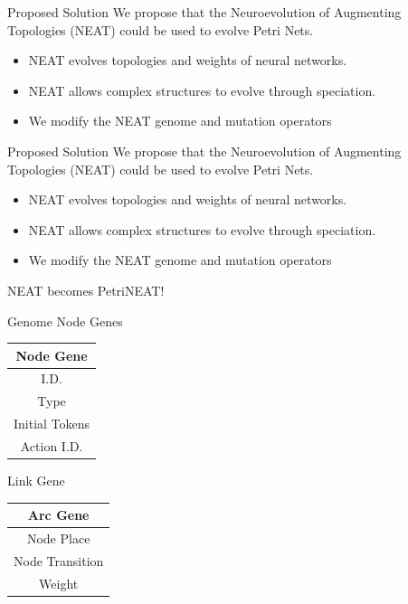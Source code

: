 \documentclass[12pt]{beamer}
\begin{document}
\begin{frame}{Proposed Solution}
We propose that the Neuroevolution of Augmenting Topologies (NEAT) could be used to evolve Petri Nets.
\begin{itemize}
\item NEAT evolves topologies and weights of neural networks.
\item NEAT allows complex structures to evolve through speciation.
\item We modify the NEAT genome and mutation operators
\end{itemize}
\vspace{4ex}

\end{frame}
\begin{frame}{Proposed Solution}
We propose that the Neuroevolution of Augmenting Topologies (NEAT) could be used to evolve Petri Nets.
\begin{itemize}
\item NEAT evolves topologies and weights of neural networks.
\item NEAT allows complex structures to evolve through speciation.
\item We modify the NEAT genome and mutation operators
\end{itemize}
\bigskip
NEAT becomes PetriNEAT!
\end{frame}


\begin{frame}{Genome}
Node Genes
\begin{table}
\centering
\begin{tabular}{|c|}
\hline
Node Gene\\ \hline
I.D. \\
Type \\
Initial Tokens \\
Action I.D. \\
\hline
\end{tabular}
\end{table}

Link Gene
\begin{table}
\centering
\begin{tabular}{|c|}
\hline
Arc Gene\\ \hline
Node Place \\
Node Transition \\
Weight \\
\hline
\end{tabular}
\end{table}

\end{frame}
\end{document}
